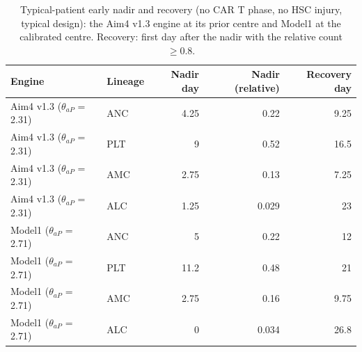 \begin{table}[!htbp]
\centering
\small
\setlength{\tabcolsep}{3.5pt}
\caption{Typical-patient early nadir and recovery (no CAR T phase, no HSC injury, typical design): the Aim4 v1.3 engine at its prior centre and Model1 at the calibrated centre. Recovery: first day after the nadir with the relative count $\geq 0.8$.}
\label{tab:aim4}
\begin{tabular}{llrrr}
\toprule
Engine & Lineage & Nadir day & Nadir (relative) & Recovery day \\
\midrule
Aim4 v1.3 ($\theta_{aP}$ = 2.31) & ANC & 4.25 & 0.22 & 9.25 \\
Aim4 v1.3 ($\theta_{aP}$ = 2.31) & PLT & 9 & 0.52 & 16.5 \\
Aim4 v1.3 ($\theta_{aP}$ = 2.31) & AMC & 2.75 & 0.13 & 7.25 \\
Aim4 v1.3 ($\theta_{aP}$ = 2.31) & ALC & 1.25 & 0.029 & 23 \\
Model1 ($\theta_{aP}$ = 2.71) & ANC & 5 & 0.22 & 12 \\
Model1 ($\theta_{aP}$ = 2.71) & PLT & 11.2 & 0.48 & 21 \\
Model1 ($\theta_{aP}$ = 2.71) & AMC & 2.75 & 0.16 & 9.75 \\
Model1 ($\theta_{aP}$ = 2.71) & ALC & 0 & 0.034 & 26.8 \\
\bottomrule
\end{tabular}
\end{table}
